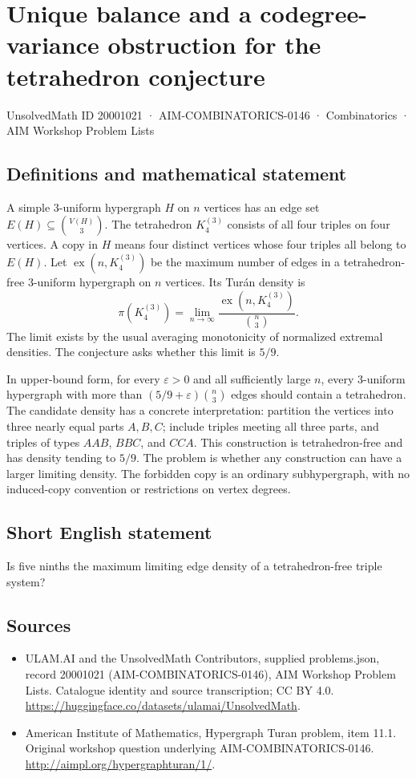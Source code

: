 \documentclass[11pt,a4paper]{article}
\begin{document}
\section*{Unique balance and a codegree-variance obstruction for the tetrahedron conjecture}\label{20001021}
{\small UnsolvedMath ID 20001021 · AIM-COMBINATORICS-0146 · Combinatorics · AIM Workshop Problem Lists}
\subsection{Definitions and mathematical statement}
A simple $3$-uniform hypergraph $H$ on $n$ vertices has an edge set
$E(H)\subseteq\binom{V(H)}3$. The tetrahedron $K_4^{(3)}$ consists
of all four triples on four vertices. A copy in $H$ means four distinct
vertices whose four triples all belong to $E(H)$.
Let $\operatorname{ex}(n,K_4^{(3)})$ be the maximum number of edges
in a tetrahedron-free $3$-uniform hypergraph on $n$ vertices. Its
Tur\'an density is
\[
 \pi(K_4^{(3)})=\lim_{n\to\infty}
       \frac{\operatorname{ex}(n,K_4^{(3)})}{\binom n3}.
\]
The limit exists by the usual averaging monotonicity of normalized
extremal densities. The conjecture asks whether this limit is $5/9$.

In upper-bound form, for every $\varepsilon>0$ and all sufficiently
large $n$, every $3$-uniform hypergraph with more than
$(5/9+\varepsilon)\binom n3$ edges should contain a tetrahedron.
The candidate density has a concrete interpretation: partition the
vertices into three nearly equal parts $A,B,C$; include triples meeting
all three parts, and triples of types $AAB$, $BBC$, and $CCA$.
This construction is tetrahedron-free and has density tending to $5/9$.
The problem is whether any construction can have a larger limiting
density. The forbidden copy is an ordinary subhypergraph, with no
induced-copy convention or restrictions on vertex degrees.
\subsection{Short English statement}
Is five ninths the maximum limiting edge density of a tetrahedron-free triple system?
\subsection{Sources}
\begin{itemize}
\item[S1] ULAM.AI and the UnsolvedMath Contributors, supplied problems.json, record 20001021 (AIM-COMBINATORICS-0146), AIM Workshop Problem Lists. Catalogue identity and source transcription; CC BY 4.0.
\url{https://huggingface.co/datasets/ulamai/UnsolvedMath}.
\item[S2] American Institute of Mathematics, Hypergraph Turan problem, item 11.1. Original workshop question underlying AIM-COMBINATORICS-0146.
\url{http://aimpl.org/hypergraphturan/1/}.
\end{itemize}
\end{document}

